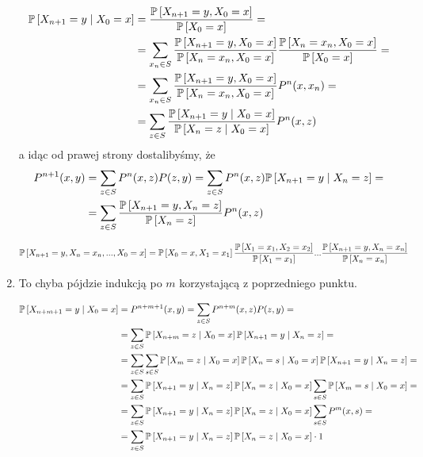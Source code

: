 \begin{solution}
\begin{enumerate}
      \begin{align*}
        \prob{X_{n+1}=y}{X_0=x}&=\frac{\prob{X_{n+1}=y, X_0=x}}{\prob{X_0=x}}=\\ 
                               &=\sum_{x_n\in S}\frac{\prob{X_{n+1}=y, X_0=x}}{\prob{X_n=x_n, X_0=x}} \frac{\prob{X_n=x_n, X_0=x}}{\prob{X_0=x}}=\\ 
                               &=\sum_{x_n\in S}\frac{\prob{X_{n+1}=y, X_0=x}}{\prob{X_n=x_n, X_0=x}}P^n(x, x_n)=\\ 
                               &=\sum_{z\in S}\frac{\prob{X_{n+1}=y}{X_0=x}}{\prob{X_n=z}{X_0=x}}P^n(x, z)
      \end{align*}
      a idąc od prawej strony dostalibyśmy, że
      \begin{align*}
        P^{n+1}(x, y)&=\sum_{z\in S}P^n(x, z)P(z, y)=\sum_{z\in S}P^n(x, z)\prob{X_{n+1}=y}{X_n=z}=\\ 
                     &=\sum_{z\in S}\frac{\prob{X_{n+1}=y, X_n=z}}{\prob{X_n=z}}P^n(x, z)
      \end{align*}

      \begin{align*}
        \prob{X_{n+1}=y, X_n=x_n,..., X_0=x}&=\prob{X_0=x, X_1=x_1}\frac{\prob{X_1=x_1, X_2=x_2}}{\prob{X_1=x_1}}...\frac{\prob{X_{n+1}=y, X_n=x_n}}{\prob{X_n=x_n}}
      \end{align*}

    \item To chyba pójdzie indukcją po $m$ korzystającą z poprzedniego punktu.

      \begin{align*}
        \prob{X_{n+m+1}=y}{X_0=x}&=P^{n+m+1}(x, y)=\sum_{z\in S}P^{n+m}(x, z)P(z, y)=\\ 
                                 &=\sum_{z\in S}\prob{X_{n+m}=z}{X_0=x}\prob{X_{n+1}=y}{X_n=z}=\\ 
                                 &=\sum_{z\in S}\sum_{s\in S}\prob{X_m=z}{X_0=x}\prob{X_n=s}{X_0=x}\prob{X_{n+1}=y}{X_n=z}=\\ 
                                 &=\sum_{z\in S}\prob{X_{n+1}=y}{X_n=z}\prob{X_n=z}{X_0=x}\sum_{s\in S}\prob{X_m=s}{X_0=x}=\\ 
                                 &=\sum_{z\in S}\prob{X_{n+1}=y}{X_n=z}\prob{X_n=z}{X_0=x}\sum_{s\in S}P^m(x, s)=\\ 
                                 &=\sum_{z\in S}\prob{X_{n+1}=y}{X_n=z}\prob{X_n=z}{X_0=x}\cdot 1
      \end{align*}
  \end{enumerate}
\end{solution}
